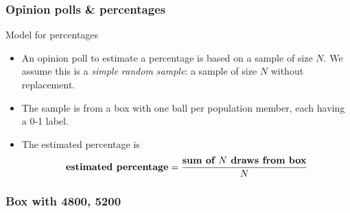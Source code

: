 \documentclass[handout]{beamer}
\begin{document}

   \begin{frame} \frametitle{Opinion polls \& percentages}

   \begin{block}
   {Model for percentages}
   \begin{itemize}
   \item An opinion poll to estimate a percentage
   is based on a sample of size $N$. We assume this is
   a {\em simple random sample}: a sample of size $N$ without replacement.

   \item The sample is from a box with one ball per population member,
   each having a 0-1 label.

   \item The estimated percentage is
   $$
   \text{\bf estimated percentage} = \frac{\text{\bf sum of $N$ draws from box}}{N}
   $$
   \end{itemize}
   \end{block}
   \end{frame}



   \begin{frame}
   \frametitle{Box with {\color{red} 4800}, {\color{blue} 5200}}
   \begin{center}
   \end{center}

   \end{frame}

\end{document}
